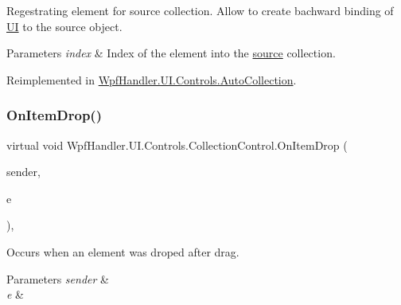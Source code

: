 Regestrating element for source collection. Allow to create bachward binding of \mbox{\hyperlink{namespace_wpf_handler_1_1_u_i}{UI}} to the source object. 


\begin{DoxyParams}{Parameters}
{\em index} & Index of the element into the \mbox{\hyperlink{class_wpf_handler_1_1_u_i_1_1_controls_1_1_collection_control_a78ccfdc5208ab2306308d7356757f32f}{source}} collection.\\
\hline
\end{DoxyParams}


Reimplemented in \mbox{\hyperlink{class_wpf_handler_1_1_u_i_1_1_controls_1_1_auto_collection_a7cea6362ca2a31dca7bca6ab1f39142d}{Wpf\+Handler.\+U\+I.\+Controls.\+Auto\+Collection}}.

\mbox{\label{class_wpf_handler_1_1_u_i_1_1_controls_1_1_collection_control_ae52c8e47654ca10e714a1e87a193331b}} 
\subsubsection{\texorpdfstring{On\+Item\+Drop()}{OnItemDrop()}}
{\footnotesize\ttfamily virtual void Wpf\+Handler.\+U\+I.\+Controls.\+Collection\+Control.\+On\+Item\+Drop (\begin{DoxyParamCaption}\item[{object}]{sender,  }\item[{Drag\+Event\+Args}]{e }\end{DoxyParamCaption})\hspace{0.3cm}{\ttfamily [protected]}, {\ttfamily [virtual]}}



Occurs when an element was droped after drag. 


\begin{DoxyParams}{Parameters}
{\em sender} & \\
\hline
{\em e} & \\
\hline
\end{DoxyParams}
\mbox{\label{class_wpf_handler_1_1_u_i_1_1_controls_1_1_collection_control_a54cf416fee122e600059ed8713d75bb0}} 
